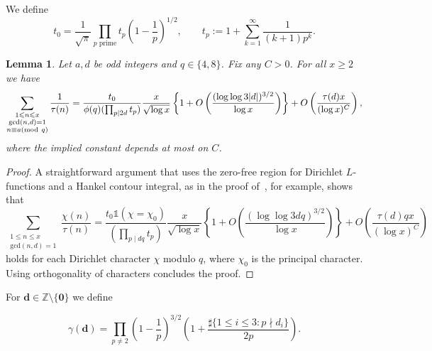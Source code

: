 \documentclass[a4paper,12pt,reqno]{amsart}
\numberwithin{equation}{section} \numberwithin{figure}{section}
\newcommand\Z{\mathbb{Z}}
\newcommand{\md}[1]{  \left(\textnormal{mod}\ #1\right)}
\renewcommand{\l}{\left}
\renewcommand{\r}{\right}
\renewcommand{\b}{\mathbf}
\renewcommand{\gcd}{\textrm{gcd}}
\renewcommand{\leq}{\leqslant}
\renewcommand{\geq}{\geqslant}
\renewcommand{\#}{\sharp}
\newtheorem{lemma}{Lemma}
\theoremstyle{definition}
\numberwithin{lemma}{section}
\newcommand{\beq}[2]
{
\begin{equation}
\label{#1}
{#2}
\end{equation}
}
\begin{document}
We define
$$t_0=\frac{1}{\sqrt \pi} \prod_{p \text{ prime}} t_p \l(1-\frac{1}{p}\r)^{1/2}, \qquad 
t_p:=1+\sum_{k=1}^\infty \frac{1}{(k+1)p^k}.$$

\begin{lemma}
\label{lem:1overdiv} Let  $a, d$ be   odd integers and  $q\in \{4,8\} $. Fix any $C>0$.
For all $x\geq 2$ we have \[\sum_{\substack{ 1\leq n \leq x \\ \gcd(n,d)=1\\n\equiv a\md q } }\frac{1}{\tau(n)}=
\frac{t_0 }{\phi(q)
(\prod_{p\mid 2d} t_p)}
\frac{x}{\sqrt{\log x } }
\l\{1+O\l(\frac{(\log \log 3|d|)^{3/2}}{\log x}\r)\r\} 
+O\l(\frac{\tau(d)x}{(\log x)^C}\r),\] where the implied constant depends at most on $C$.
\end{lemma}\begin{proof} A straightforward argument that uses   the zero-free region for Dirichlet $L$-functions
and  a Hankel contour integral, as in the proof of~\cite[Lemma 1]{MR2675875}, for example, shows that   
\[
\sum_{\substack{ 1\leq n \leq x \\ \gcd(n,d)=1  } }\frac{\chi(n)}{\tau(n)} = \frac{t_0 \mathds 1 (\chi=\chi_0)}{
(\prod_{p\mid dq} t_p)}
\frac{x}{\sqrt{\log x } }
\l\{1+O\l(\frac{(\log \log 3dq)^{3/2}}{\log x}\r)\r\} 
+O\l(\frac{\tau(d)qx}{(\log x)^C}\r)\] holds for each Dirichlet character $\chi $ modulo $q$,
where $\chi_0$ is the principal character.  Using orthogonality of characters concludes the proof.
\end{proof} 
 For $\b d \in \Z \setminus\{\b 0 \} $ we define 
\beq{defgambd}
{\gamma(\b d )= 
  \prod_{p\neq 2  } 
\l(1-\frac{1}{p} \r)^{3/2}
\l(1+  \frac{\#\{1\leq i  \leq 3 : p\nmid d_i \}}{2 p} \r) 
 .}  
\end{document}

